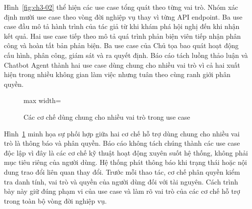 Hình~\ref{fig:ch3-02} thể hiện các use case tổng quát theo từng vai trò. Nhóm xác định mười use case theo vòng đời nghiệp vụ thay vì từng API endpoint. Ba use case đầu mô tả hành trình của tác giả từ khi khám phá hội nghị đến khi nhận kết quả. Hai use case tiếp theo mô tả quá trình phản biện viên tiếp nhận phân công và hoàn tất bản phản biện. Ba use case của Chủ tọa bao quát hoạt động cấu hình, phân công, giám sát và ra quyết định. Báo cáo tách luồng thảo luận và Chatbot Agent thành hai use case dùng chung cho nhiều vai trò vì cả hai xuất hiện trong nhiều không gian làm việc nhưng tuân theo cùng ranh giới phân quyền.

\begin{figure}[H]
  \centering
  \begin{adjustbox}{max width=\textwidth}
  \end{adjustbox}
  \caption{Các cơ chế dùng chung cho nhiều vai trò trong use case}
  \label{fig:ch3-03}
\end{figure}

Hình~\ref{fig:ch3-03} minh họa sự phối hợp giữa hai cơ chế hỗ trợ dùng chung cho nhiều vai trò là thông báo và phân quyền. Báo cáo không tách chúng thành các use case độc lập vì đây là các cơ chế kỹ thuật hoạt động xuyên suốt hệ thống, không phải mục tiêu riêng của người dùng. Hệ thống phát thông báo khi trạng thái hoặc nội dung trao đổi liên quan thay đổi. Trước mỗi thao tác, cơ chế phân quyền kiểm tra danh tính, vai trò và quyền của người dùng đối với tài nguyên. Cách trình bày này giữ đúng phạm vi của use case và làm rõ vai trò của các cơ chế hỗ trợ trong toàn bộ vòng đời nghiệp vụ.

